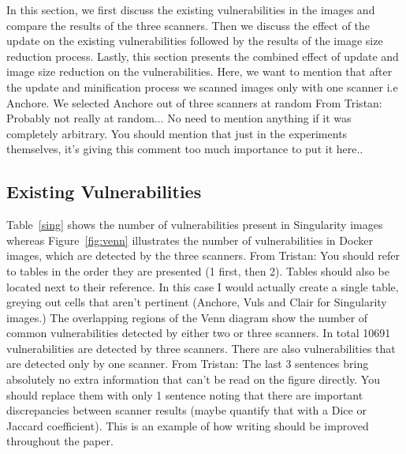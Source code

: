 \documentclass[a4paper,num-refs]{oup-contemporary}
\newcommand{\tristan}[1]{\color{blue}From Tristan: #1\color{black}}
\begin{document}
In this section,
we first discuss the existing vulnerabilities in the images and compare the
results of the three scanners. Then we discuss the effect of the update on the
existing vulnerabilities followed by the results of the image size reduction
process. Lastly, this section presents the combined effect of update and image size reduction on the
vulnerabilities. Here, we want to mention that after the update and minification process we scanned
images only with one scanner i.e Anchore. We selected Anchore out of three scanners at random \tristan{Probably not really at random... 
No need to mention anything if it was completely arbitrary. You should mention that just in the experiments themselves, it's giving this comment too much importance to put it here.}. 

\subsection{Existing Vulnerabilities}

Table~\ref{sing} shows the number of vulnerabilities present in Singularity
images whereas Figure~\ref{fig:venn} illustrates the number of
vulnerabilities in Docker images, which are detected by the three scanners.
\tristan{You should refer to tables in the order they are presented (1
first, then 2). Tables should also be located next to their reference. In
this case I would actually create a single table, greying out cells that
aren't pertinent (Anchore, Vuls and Clair for Singularity images.)}
 The
overlapping regions of the Venn diagram show the number of common vulnerabilities detected by either two or
three scanners. In total 10691 vulnerabilities are detected by three scanners.
There are also vulnerabilities that are detected only by one scanner. \tristan{The last 3 sentences bring absolutely no 
extra information that can't be read on the figure directly. You should replace them with only 1 sentence noting that there 
are important discrepancies between scanner results (maybe quantify that with a Dice or Jaccard coefficient). This is an example 
of how writing should be improved throughout the paper.}
\end{document}
